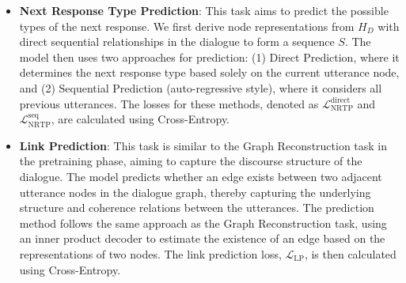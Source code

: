 \documentclass[letterpaper]{article} %
\begin{document}
\begin{itemize}
    \item \textbf{Next Response Type Prediction}: This task aims to predict the possible types of the next response. We first derive node representations from $H_D$ with direct sequential relationships in the dialogue to form a sequence $S$. The model then uses two approaches for prediction: (1) Direct Prediction, where it determines the next response type based solely on the current utterance node, and (2) Sequential Prediction (auto-regressive style), where it considers all previous utterances. The losses for these methods, denoted as $\mathcal{L}_{\text{NRTP}}^{\text{direct}}$ and $\mathcal{L}_{\text{NRTP}}^{\text{seq}}$, are calculated using Cross-Entropy.

    \item \textbf{Link Prediction}: This task is similar to the Graph Reconstruction task in the pretraining phase, aiming to capture the discourse structure of the dialogue. The model predicts whether an edge exists between two adjacent utterance nodes in the dialogue graph, thereby capturing the underlying structure and coherence relations between the utterances. The prediction method follows the same approach as the Graph Reconstruction task, using an inner product decoder to estimate the existence of an edge based on the representations of two nodes. The link prediction loss, \( \mathcal{L}_{\text{LP}} \), is then calculated using Cross-Entropy.

\end{itemize}
\end{document}
